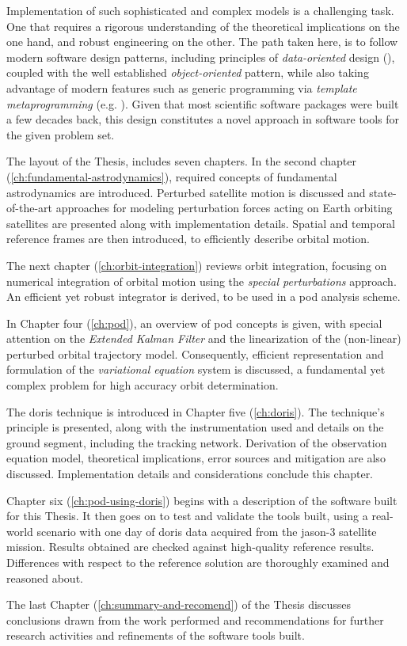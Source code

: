 Implementation of such sophisticated and complex models is a challenging task. One that requires a 
rigorous understanding of the theoretical implications on the one hand, and robust 
engineering on the other. The path taken here, is to follow modern software design 
patterns, including principles of \emph{data-oriented} design (\cite{Fabian2018}), coupled with 
the well established \emph{object-oriented} pattern, while also taking advantage of 
modern features such as generic programming via \emph{template metaprogramming} 
(e.g. \cite{Gawlik2018}). Given that most scientific software packages were built 
a few decades back, this design constitutes a novel approach in software tools for 
the given problem set.

The layout of the Thesis, includes seven chapters. In the second chapter 
(\autoref{ch:fundamental-astrodynamics}), required concepts of 
fundamental astrodynamics are introduced. Perturbed satellite motion is discussed and 
state-of-the-art approaches for modeling perturbation forces acting on Earth orbiting 
satellites are presented along with implementation details. Spatial and temporal reference 
frames are then introduced, to efficiently describe orbital motion.

The next chapter (\autoref{ch:orbit-integration}) reviews orbit integration, focusing on 
numerical integration of orbital motion using the \emph{special perturbations} 
approach. An efficient yet robust integrator is derived, to be used in a \gls{pod} 
analysis scheme.

In Chapter four (\autoref{ch:pod}), an overview of \gls{pod} concepts is given, 
with special attention on the \emph{Extended Kalman Filter} and the linearization 
of the (non-linear) perturbed orbital trajectory model. Consequently, efficient 
representation and formulation of the \emph{variational equation} system is discussed, 
a fundamental yet complex problem for high accuracy orbit determination.

The \gls{doris} technique is introduced in Chapter five (\autoref{ch:doris}). 
The technique's principle is presented, along with the instrumentation used and 
details on the ground segment, including the tracking network. Derivation of the 
observation equation model, theoretical implications, error sources and mitigation are 
also discussed. Implementation details and considerations conclude this 
chapter.

Chapter six (\autoref{ch:pod-using-doris}) begins with a description of the 
software built for this Thesis. It then goes on to test and validate the tools built, 
using a real-world scenario with one day of \gls{doris} data acquired from the 
\gls{jason}-3 satellite mission. Results obtained are checked against high-quality 
reference results. Differences with respect to the reference solution are thoroughly 
examined and reasoned about.

The last Chapter (\autoref{ch:summary-and-recomend}) of the Thesis discusses 
conclusions drawn from the work performed and recommendations for further research 
activities and refinements of the software tools built.

\iffalse
Earth observation via artificial satellites and its numerous
missions and applications is heavily relied upon orbit determination;
\fi
